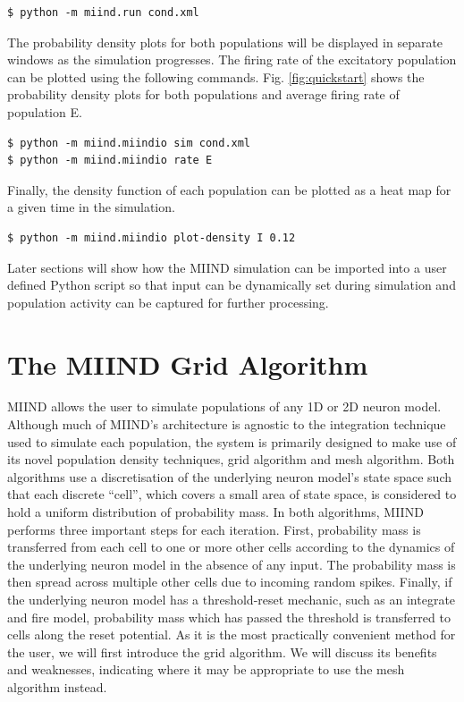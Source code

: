 \documentclass[utf8]{frontiersSCNS} %
\begin{document}
\begin{lstlisting}[caption={Run the cond.xml simulation.}]
$ python -m miind.run cond.xml
\end{lstlisting}

The probability density plots for both populations will be displayed in separate windows as the simulation progresses. The firing rate of the excitatory population can be plotted using the following commands. Fig. \ref{fig:quickstart} shows the probability density plots for both populations and average firing rate of population E.

\begin{lstlisting}[caption={Load the cond.xml simulation and plot the average firing rate of population E.}]
$ python -m miind.miindio sim cond.xml
$ python -m miind.miindio rate E
\end{lstlisting}

Finally, the density function of each population can be plotted as a heat map for a given time in the simulation.

\begin{lstlisting}[caption={Plot the probability density of population I at time 0.12s.}]
$ python -m miind.miindio plot-density I 0.12
\end{lstlisting}

Later sections will show how the MIIND simulation can be imported into a user defined Python script so that input can be dynamically set during simulation and population activity can be captured for further processing. 

\section{The MIIND Grid Algorithm}
\label{gridalgorithm}
MIIND allows the user to simulate populations of any 1D or 2D neuron model. Although much of MIIND’s architecture is agnostic to the integration technique used to simulate each population, the system is primarily designed to make use of its novel population density techniques, grid algorithm and mesh algorithm. Both algorithms use a discretisation of the underlying neuron model's state space such that each discrete ``cell'', which covers a small area of state space, is considered to hold a uniform distribution of probability mass. In both algorithms, MIIND performs three important steps for each iteration. First, probability mass is transferred from each cell to one or more other cells according to the dynamics of the underlying neuron model in the absence of any input. The probability mass is then spread across multiple other cells due to incoming random spikes. Finally, if the underlying neuron model has a threshold-reset mechanic, such as an integrate and fire model, probability mass which has passed the threshold is transferred to cells along the reset potential. As it is the most practically convenient method for the user, we will first introduce the grid algorithm. We will discuss its benefits and weaknesses, indicating where it may be appropriate to use the mesh algorithm instead.\\
\end{document}
